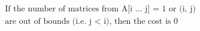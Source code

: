 \documentclass[preview]{standalone}
\begin{document}
\begin{center}
\begin{align*}
&\text{If the number of matrices from A[i ... j] = 1 or (i, j)}\\
&\text{are out of bounds (i.e. j < i), then the cost is 0}
\end{align*}
\end{center}
\end{document}

